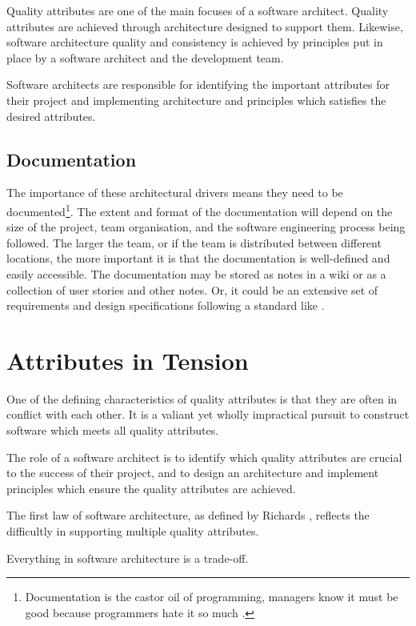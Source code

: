 Quality attributes are one of the main focuses of a software architect.
Quality attributes are achieved through architecture designed to support them.
Likewise, software architecture quality and consistency is achieved by principles put in place by a software architect and the development team.

Software architects are responsible for identifying the important attributes for their project
and implementing architecture and principles which satisfies the desired attributes.

\subsection{Documentation}
The importance of these architectural drivers means they need to be documented\footnote{Documentation is the castor oil of programming,
managers know it must be good because programmers hate it so much \cite{psychprog}.}.
The extent and format of the documentation will depend on the size of the project, team organisation,
and the software engineering process being followed.
The larger the team, or if the team is distributed between different locations,
the more important it is that the documentation is well-defined and easily accessible.
The documentation may be stored as notes in a wiki or as a collection of user stories and other notes.
Or, it could be an extensive set of requirements and design specifications following a standard like
.

\section{Attributes in Tension}
One of the defining characteristics of quality attributes is that they are often in conflict with each other.
It is a valiant yet wholly impractical pursuit to construct software which meets all quality attributes.

The role of a software architect is to identify which quality attributes are crucial to the success of their project,
and to design an architecture and implement principles which ensure the quality attributes are achieved.

\filbreak
The first law of software architecture, as defined by Richards \cite{richards2020fundamentals}, reflects the difficultly in supporting multiple quality attributes.

\begin{definition}
Everything in software architecture is a trade-off.
\end{definition}


